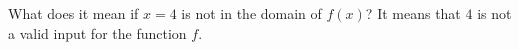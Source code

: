{What does it mean if $x=4$ is not in the domain of $f(x)$?}
{It means that $4$ is not a valid input for the function $f$.}
